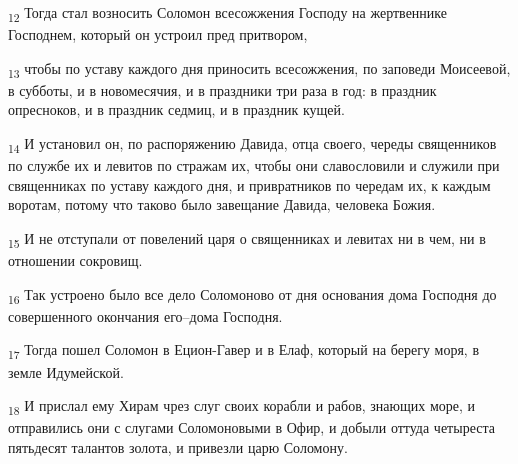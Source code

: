\begin{tcolorbox}
\textsubscript{12} Тогда стал возносить Соломон всесожжения Господу на жертвеннике Господнем, который он устроил пред притвором,
\end{tcolorbox}
\begin{tcolorbox}
\textsubscript{13} чтобы по уставу каждого дня приносить всесожжения, по заповеди Моисеевой, в субботы, и в новомесячия, и в праздники три раза в год: в праздник опресноков, и в праздник седмиц, и в праздник кущей.
\end{tcolorbox}
\begin{tcolorbox}
\textsubscript{14} И установил он, по распоряжению Давида, отца своего, череды священников по службе их и левитов по стражам их, чтобы они славословили и служили при священниках по уставу каждого дня, и привратников по чередам их, к каждым воротам, потому что таково было завещание Давида, человека Божия.
\end{tcolorbox}
\begin{tcolorbox}
\textsubscript{15} И не отступали от повелений царя о священниках и левитах ни в чем, ни в отношении сокровищ.
\end{tcolorbox}
\begin{tcolorbox}
\textsubscript{16} Так устроено было все дело Соломоново от дня основания дома Господня до совершенного окончания его--дома Господня.
\end{tcolorbox}
\begin{tcolorbox}
\textsubscript{17} Тогда пошел Соломон в Ецион-Гавер и в Елаф, который на берегу моря, в земле Идумейской.
\end{tcolorbox}
\begin{tcolorbox}
\textsubscript{18} И прислал ему Хирам чрез слуг своих корабли и рабов, знающих море, и отправились они с слугами Соломоновыми в Офир, и добыли оттуда четыреста пятьдесят талантов золота, и привезли царю Соломону.
\end{tcolorbox}
